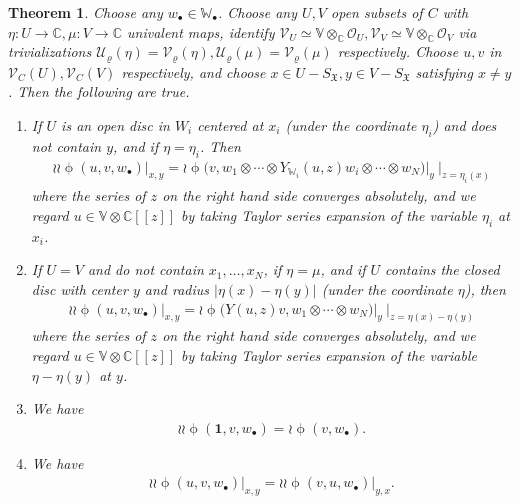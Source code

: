 \documentclass[12pt,b5paper,notitlepage]{report}
\theoremstyle{definition}
\theoremstyle{plain}
\newtheorem{thm}[df]{Theorem}
\newcommand{\fk}{\mathfrak}
\newcommand{\mc}{\mathcal}
\newcommand{\id}{\mathbf{1}}
\newcommand{\scr}{\mathscr}
\newcommand{\blt}{\bullet}
\newcommand{\Vbb}{\mathbb V}
\newcommand{\Wbb}{\mathbb W}
\newcommand{\Cbb}{\mathbb C}
\numberwithin{equation}{section}
\begin{document}
\begin{thm}\label{lb48}
Choose  any $w_\blt\in\Wbb_\blt$. Choose any $U,V$ open subsets of $C$ with $\eta:U\rightarrow\Cbb,\mu:V\rightarrow\Cbb$ univalent maps,  identify $\scr V_U\simeq \Vbb\otimes_\Cbb\scr O_U,\scr V_V\simeq \Vbb\otimes_\Cbb\scr O_V$ via trivializations $\mc U_\varrho(\eta)=\mc V_\varrho(\eta),\mc U_\varrho(\mu)=\mc V_\varrho(\mu)$ respectively. Choose $u,v$   in $\scr V_C(U),\scr V_C(V)$ respectively, and choose $x\in U-S_{\fk X},y\in V-S_{\fk X}$ satisfying $x\neq y$. Then the following are true.
\begin{enumerate}[label=(\arabic*)]
\item If $U$ is an open disc in $W_i$ centered at $x_i$ (under the coordinate $\eta_i$) and does not contain $y$, and if $\eta=\eta_i$. Then
\begin{align}
\wr\wr\upphi(u,v,w_\blt)\big|_{x,y}=\wr\upphi\big(v,w_1\otimes\cdots\otimes Y_{\Wbb_i}(u,z)w_i\otimes\cdots\otimes w_N\big)\big|_y~\big|_{z=\eta_i(x)}
\end{align}
where the series of $z$ on the right hand side converges absolutely, and we regard $u\in\Vbb\otimes\Cbb[[z]]$ by taking Taylor series expansion of the variable $\eta_i$ at $x_i$.
\item If $U=V$ and do not contain $x_1,\dots,x_N$, if $\eta=\mu$, and if $U$ contains the closed disc with center $y$ and radius $|\eta(x)-\eta(y)|$ (under the coordinate $\eta$), then
\begin{align}
\wr\wr\upphi(u,v,w_\blt)\big|_{x,y}=\wr\upphi\big(Y(u,z)v,w_1\otimes\cdots\otimes w_N\big)\big |_y~\big |_{z=\eta(x)-\eta(y)}
\end{align}
where the series of $z$ on the right hand side converges absolutely, and we regard $u\in\Vbb\otimes\Cbb[[z]]$ by taking Taylor series expansion of the variable $\eta-\eta(y)$ at $y$.
\item  We have
\begin{align}
\wr\wr\upphi(\id,v,w_\blt)=\wr\upphi(v,w_\blt).
\end{align}
\item We have
\begin{align}
\wr\wr\upphi(u,v,w_\blt)\big|_{x,y}=\wr\wr\upphi(v,u,w_\blt)\big|_{y,x}.
\end{align}
\end{enumerate}
\end{thm}
\end{document}
